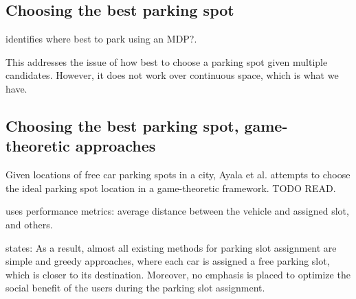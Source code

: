 % 
% 
% 
% 
% 
% 
% 


\subsection{Choosing the best parking spot}
\cite{bogoslavskyi2015where} identifies where best to park using an MDP?.

This addresses the issue of how best to choose a parking spot given multiple
candidates. However, it does not work over continuous space, which is what we
have.

\subsection{Choosing the best parking spot, game-theoretic approaches}
Given locations of free car parking spots in a city, Ayala et al.
\cite{ayala2011parking} attempts to choose the ideal parking spot location
in a game-theoretic framework. TODO READ.
\cite{ayala2012parking}

\cite{mejri2014cooperation} uses performance metrics: average distance between
the vehicle and assigned slot, and others.

\cite{alfonsetti2014semi} states: 
As a result, almost all existing methods for parking slot assignment are simple
and greedy approaches, where each car is assigned a free parking slot, which is
closer to its destination. Moreover, no emphasis is placed to optimize the
social benefit of the users during the parking slot assignment. 

